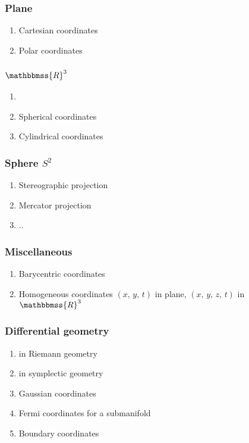 \documentclass[12pt]{article}
\newcommand{\R}{\mathbbmss{R}}
\begin{document}
\subsubsection*{Plane}
\begin{enumerate}
\item Cartesian coordinates
\item Polar coordinates
\end{enumerate}

\subsubsection*{$\R^3$}
\begin{enumerate}
\item {}
\item Spherical coordinates
\item Cylindrical coordinates
\end{enumerate}

\subsubsection*{Sphere $S^2$}
\begin{enumerate}
\item Stereographic projection
\item Mercator projection
\item ..
\end{enumerate}


\subsubsection*{Miscellaneous}
\begin{enumerate}
\item Barycentric coordinates
\item Homogeneous coordinates $(x,\,y,\,t)$ in plane, $(x,\,y,\,z,\,t)$ in $\R^3$
\end{enumerate}

\subsubsection*{Differential geometry}
\begin{enumerate}
\item {} in Riemann geometry
\item {} in symplectic geometry
\item Gaussian coordinates
\item Fermi coordinates for a submanifold
\item Boundary coordinates
\end{enumerate}
\end{document}
